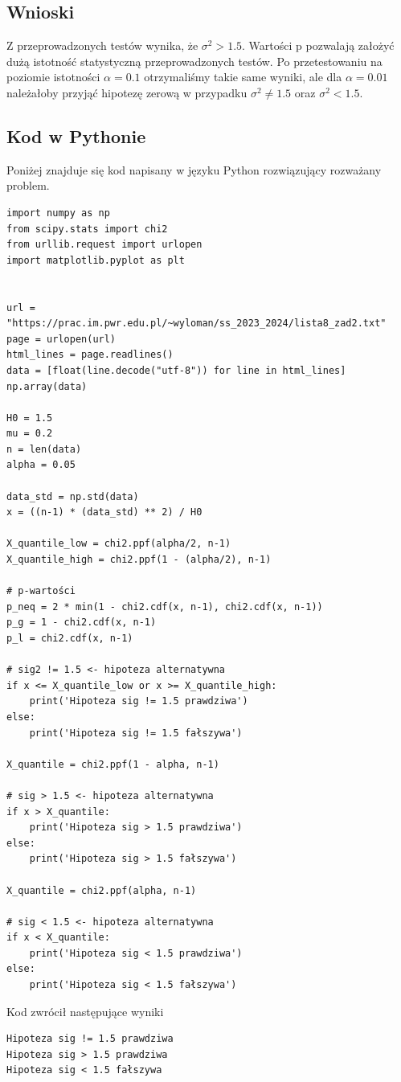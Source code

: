 \documentclass{article}
\begin{document}
\subsection{Wnioski}
Z przeprowadzonych testów wynika, że $\sigma^{2}>1.5$. Wartości p pozwalają założyć dużą istotność statystyczną przeprowadzonych testów. Po przetestowaniu na poziomie istotności $\alpha=0.1$ otrzymaliśmy takie same wyniki, ale dla $\alpha=0.01$ należałoby przyjąć hipotezę zerową w przypadku $\sigma^{2}\neq1.5$ oraz $\sigma^{2}<1.5$.

\subsection{Kod w Pythonie}
Poniżej znajduje się kod napisany w języku Python rozwiązujący rozważany problem.
\begin{verbatim}
import numpy as np
from scipy.stats import chi2
from urllib.request import urlopen
import matplotlib.pyplot as plt


url = "https://prac.im.pwr.edu.pl/~wyloman/ss_2023_2024/lista8_zad2.txt"
page = urlopen(url)
html_lines = page.readlines()
data = [float(line.decode("utf-8")) for line in html_lines]
np.array(data)

H0 = 1.5
mu = 0.2
n = len(data)
alpha = 0.05

data_std = np.std(data)
x = ((n-1) * (data_std) ** 2) / H0 

X_quantile_low = chi2.ppf(alpha/2, n-1)
X_quantile_high = chi2.ppf(1 - (alpha/2), n-1)

# p-wartości
p_neq = 2 * min(1 - chi2.cdf(x, n-1), chi2.cdf(x, n-1))
p_g = 1 - chi2.cdf(x, n-1)
p_l = chi2.cdf(x, n-1)

# sig2 != 1.5 <- hipoteza alternatywna
if x <= X_quantile_low or x >= X_quantile_high:
    print('Hipoteza sig != 1.5 prawdziwa')
else: 
    print('Hipoteza sig != 1.5 fałszywa')

X_quantile = chi2.ppf(1 - alpha, n-1)

# sig > 1.5 <- hipoteza alternatywna
if x > X_quantile:
    print('Hipoteza sig > 1.5 prawdziwa')    
else:
    print('Hipoteza sig > 1.5 fałszywa')

X_quantile = chi2.ppf(alpha, n-1)

# sig < 1.5 <- hipoteza alternatywna
if x < X_quantile:
    print('Hipoteza sig < 1.5 prawdziwa')    
else:
    print('Hipoteza sig < 1.5 fałszywa')
\end{verbatim}
Kod zwrócił następujące wyniki
\begin{verbatim}
Hipoteza sig != 1.5 prawdziwa
Hipoteza sig > 1.5 prawdziwa
Hipoteza sig < 1.5 fałszywa
\end{verbatim}
\end{document}

